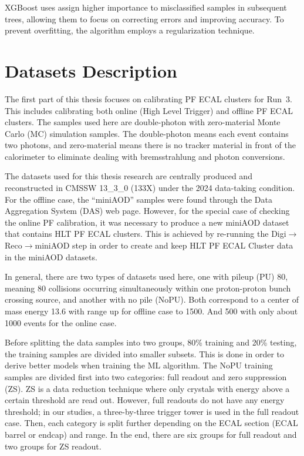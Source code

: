 XGBoost uses assign higher importance to misclassified samples in subsequent trees, allowing them to focus on correcting errors and improving accuracy.
To prevent overfitting, %
the algorithm employs a regularization technique.


\section{Datasets Description}
The first part of this thesis focuses on calibrating PF ECAL clusters for Run~3.
This includes calibrating both online (High Level Trigger) and offline PF ECAL clusters.
The samples used here are double-photon with zero-material Monte Carlo (MC) simulation samples.
The double-photon means each event contains two photons, and zero-material means there is no tracker material in front of the calorimeter to eliminate dealing with bremsstrahlung and photon conversions.

The datasets used for this thesis research are centrally produced and reconstructed in CMSSW 13\_3\_0 (133X) under the 2024 data-taking condition.
For the offline case, the ``miniAOD'' samples were found through the Data Aggregation System (DAS) web page.
However, for the special case of checking the online PF calibration, it was necessary to produce a new miniAOD dataset that contains HLT PF ECAL clusters.
This is achieved by re-running the Digi$\rightarrow$Reco$\rightarrow$miniAOD step in order to create and keep HLT PF ECAL Cluster data in the miniAOD datasets.

In general, there are two types of datasets used here, one with pileup (PU) 80, meaning 80 collisions occurring simultaneously within one proton-proton bunch crossing source, and another with no pile (NoPU).
Both correspond to a center of mass energy 13.6 \TeV with \pt range up for offline case to 1500\GeV{}. And 500\GeV{} with only about 1000 events for the online case.

Before splitting the data samples into two groups, 80\% training and 20\% testing, the training samples are divided into smaller subsets.
This is done in order to derive better models when training the ML algorithm.
The NoPU training samples are divided first into two categories: full readout and zero suppression (ZS). ZS is a data reduction technique where only crystals with energy above a certain threshold are read out. However, full readouts do not have any energy threshold; in our studies, a three-by-three trigger tower is used in the full readout case.%
Then, each category is split further depending on the ECAL section (ECAL barrel or endcap) and \pt range.
In the end, there are six groups for full readout and two groups for ZS readout.

